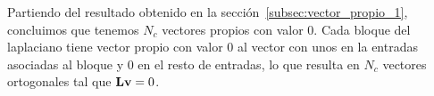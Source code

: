 \documentclass{article}
\begin{document}
Partiendo del resultado obtenido en la sección~\ref{subsec:vector_propio_1}, concluimos que tenemos $N_c$ vectores propios con valor 0. Cada bloque del laplaciano tiene vector propio con valor 0 al vector con unos en la entradas asociadas al bloque y 0 en el resto de entradas, lo que resulta en $N_c$ vectores ortogonales tal que $\mathbf{L} \mathbf{v} = 0$.
\end{document}
